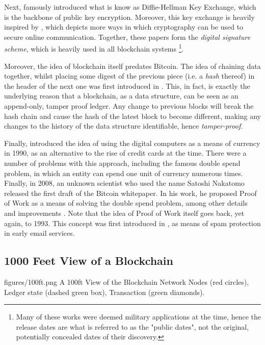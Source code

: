 Next, \cite{diffieNewDirectionsCryptography1976} famously introduced what is know as Diffie-Hellman
Key Exchange, which is the backbone of public key encryption. Moreover, this key exchange is heavily
inspired by \cite{merkleSecureCommunicationsInsecure1978}, which depicts more ways in which
cryptography can be used to secure online communication. Together, these papers form the
\textit{digital signature scheme}, which is heavily used in all blockchain systems \footnote{Many of
these works were deemed military applications at the time, hence the release dates are what is
referred to as the "public dates", not the original, potentially concealed dates of their
discovery.}.

Moreover, the idea of blockchain itself predates Bitcoin. The idea of chaining data together, whilst
placing some digest of the previous piece (i.e. a \textit{hash} thereof) in the header of the next
one was first introduced in \cite{haberHowTimestampDigital1991}. This, in fact, is exactly the
underlying reason that a blockchain, as a data structure, can be seen as an append-only, tamper
proof ledger. Any change to previous blocks will break the hash chain and cause the hash of the
latest block to become different, making any changes to the history of the data structure
identifiable, hence \textit{tamper-proof}.

Finally, \cite{chaumUntraceableElectronicCash1990} introduced the idea of using the digital
computers as a means of currency in 1990, as an alternative to the rise of credit cards at the time.
There were a number of problems with this approach, including the famous double spend problem, in
which an entity can spend one unit of currency numerous times. Finally, in 2008, an unknown
scientist who used the name Satoshi Nakatomo released the first draft of the Bitcoin whitepaper. In
his work, he proposed Proof of Work as a means of solving the double spend problem, among other
details and improvements \cite{nakamotoBitcoinPeertoPeerElectronic}. Note that the idea of Proof of
Work itself goes back, yet again, to 1993. This concept was first introduced in
\cite{dworkPricingProcessingCombatting1993}, as means of spam protection in early email services.

\subsection{1000 Feet View of a Blockchain} \label{chap_bg:subsec:100ft}

\figuremacro
	{figures/100ft.png}
	{A 100ft View of the Blockchain Network}
	{Nodes (red circles), Ledger state (dashed green box), Transaction (green diamonds).}

